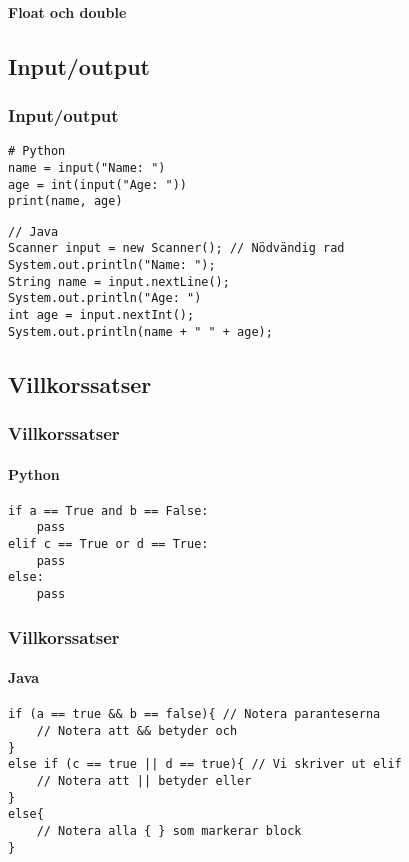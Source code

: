 \documentclass[aspectratio=169]{beamer}
\begin{document}
\begin{frame}[fragile]
    \framesubtitle{Float och double}


\end{frame}

\subsection{Input/output}

\begin{frame}[fragile]
    \frametitle{Input/output}

    \begin{lstlisting}[style=python]
# Python
name = input("Name: ")
age = int(input("Age: "))
print(name, age)
    \end{lstlisting}

    \begin{lstlisting}[style=java]
// Java
Scanner input = new Scanner(); // Nödvändig rad
System.out.println("Name: ");
String name = input.nextLine();
System.out.println("Age: ")
int age = input.nextInt();
System.out.println(name + " " + age);
    \end{lstlisting}

\end{frame}

\subsection{Villkorssatser}

\begin{frame}[fragile]
    \frametitle{Villkorssatser}
    \framesubtitle{Python}

    \begin{lstlisting}[style=python]
if a == True and b == False:
    pass
elif c == True or d == True:
    pass
else:
    pass
    \end{lstlisting}

\end{frame}

\begin{frame}[fragile]
    \frametitle{Villkorssatser}
    \framesubtitle{Java}

    \begin{lstlisting}[style=java]
if (a == true && b == false){ // Notera paranteserna
    // Notera att && betyder och
}
else if (c == true || d == true){ // Vi skriver ut elif
    // Notera att || betyder eller
}
else{
    // Notera alla { } som markerar block
}
    \end{lstlisting}

\end{frame}
\end{document}
